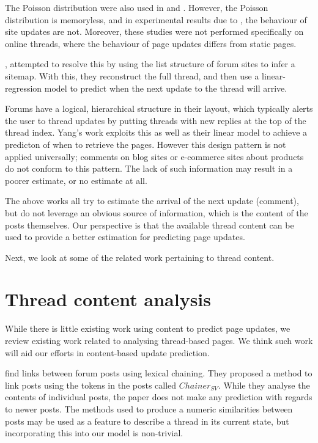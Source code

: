 The Poisson distribution were also used in  and 
. %
However, the Poisson distribution is memoryless, and in experimental results due 
to , the behaviour of site updates are not. Moreover, these 
studies were not performed specifically on online threads, where the behaviour 
of page updates differs from static pages.

, attempted to resolve this by using the list structure of 
forum sites to infer a sitemap. With this, they reconstruct the full thread, and 
then use a linear-regression model to predict when the next update to the thread 
will arrive. 

Forums have a logical, hierarchical structure in their 
layout, which typically alerts the user to thread updates by putting threads 
with new replies at the top of the thread index. Yang's work exploits this 
as well as their linear model to achieve a predicton of when to retrieve the
pages.  However this design pattern is not applied universally; 
comments on blog sites 
or e-commerce sites about products do not conform to this pattern.  The lack of such 
information may result in a poorer estimate, or no estimate at all.

The above works all try to estimate the arrival of the next update (comment), but do not leverage an obvious source of information, which is the content of the posts themselves. Our perspective
is that the available thread content can be used to provide a better estimation for predicting page updates. 

Next, we look at some of the related work
pertaining to thread content.

\section{Thread content analysis}
While there is little existing work using content to predict page updates, we 
review existing work related to analysing thread-based pages.  We 
think such work will aid our efforts in content-based update prediction.

 find links between forum posts using 
lexical chaining. They proposed a method to link posts using the tokens in the 
posts called $Chainer_{SV}$. While they analyse the contents of individual 
posts, the paper does not make any prediction with regards to newer posts. The 
methods used to produce a numeric similarities between posts may be used as a 
feature to describe a thread in its current state, 
but incorporating this into 
our model is non-trivial.

